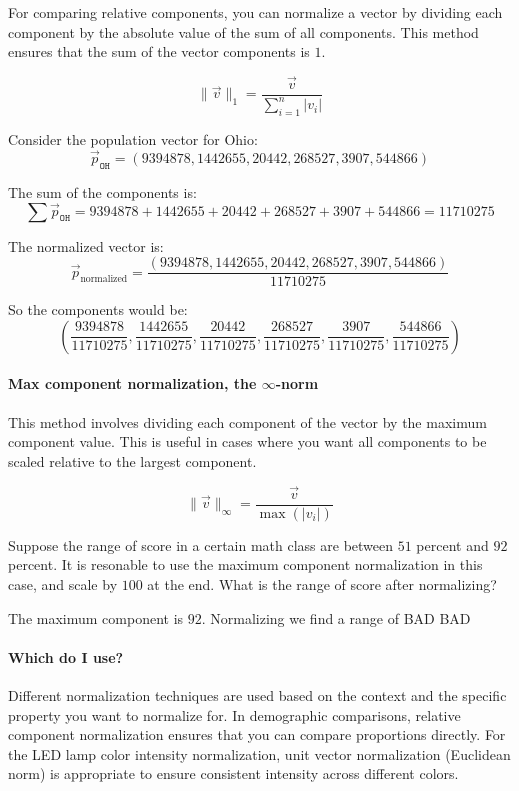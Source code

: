 \documentclass{ximera}
\begin{document}
For comparing relative components, you can normalize a vector by
dividing each component by the absolute value of the sum of all
components. This method ensures that the sum of the vector components
is $1$.

\[ \|\vec{v}\|_1 = \frac{\vec{v}}{\sum_{i=1}^n |v_i|} \]

\begin{example}
Consider the population vector for Ohio:
\[ \vec{p}_{\texttt{OH}} = (9394878, 1442655, 20442, 268527, 3907, 544866) \]

The sum of the components is:
\[ \sum \vec{p}_{\texttt{OH}} = 9394878 + 1442655 + 20442 + 268527 + 3907 + 544866 = 11710275 \]

The normalized vector is:
\[ \vec{p}_{\text{normalized}} = \frac{(9394878, 1442655, 20442, 268527, 3907, 544866)}{11710275} \]

So the components would be:
\[ \left(\frac{9394878}{11710275}, \frac{1442655}{11710275}, \frac{20442}{11710275}, \frac{268527}{11710275}, \frac{3907}{11710275}, \frac{544866}{11710275}\right) \]
\end{example}






\paragraph{Max component normalization, the $\infty$-norm}

This method involves dividing each component of the vector by the maximum component value. This is useful in cases where you want all components to be scaled relative to the largest component.

\[ \|\vec{v}\|_\infty = \frac{\vec{v}}{\max(|v_i|)} \]

\begin{example}
Suppose the range of score in a certain math class are between $51$
percent and $92$ percent. It is resonable to use the maximum component
normalization in this case, and scale by $100$ at the end. What is the
range of score after normalizing?
\begin{explanation}
The maximum component is $92$. Normalizing we find a range of  BAD BAD
\end{explanation}
\end{example}
\paragraph{Which do I use?}
Different normalization techniques are used based on the context and
the specific property you want to normalize for. In demographic
comparisons, relative component normalization ensures that you can
compare proportions directly. For the LED lamp color intensity
normalization, unit vector normalization (Euclidean norm) is
appropriate to ensure consistent intensity across different colors.
\end{document}
